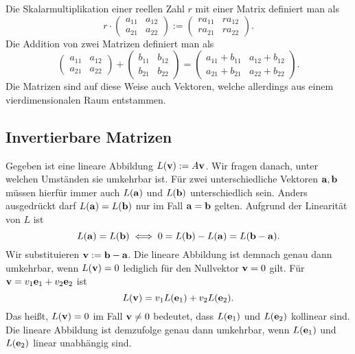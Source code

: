Die Skalarmultiplikation einer reellen Zahl $r$ mit einer Matrix
definiert man als%
\[r\cdot\begin{pmatrix}
a_{11} & a_{12}\\
a_{21} & a_{22}\end{pmatrix}
:= \begin{pmatrix}
ra_{11} & ra_{12}\\
ra_{21} & ra_{22}\end{pmatrix}.\]
Die Addition von zwei Matrizen definiert man als%
\[\begin{pmatrix}
a_{11} & a_{12}\\
a_{21} & a_{22}
\end{pmatrix} + \begin{pmatrix}
b_{11} & b_{12}\\
b_{21} & b_{22}
\end{pmatrix} = \begin{pmatrix}
a_{11}+b_{11} & a_{12}+b_{12}\\
a_{21}+b_{21} & a_{22}+b_{22}
\end{pmatrix}.\]
Die Matrizen sind auf diese Weise auch Vektoren, welche allerdings
aus einem vierdimensionalen Raum entstammen.

\subsection{Invertierbare Matrizen}

Gegeben ist eine lineare Abbildung $L(\mathbf{v}):=A\mathbf{v}$. Wir
fragen danach, unter welchen Umständen sie umkehrbar ist. Für zwei
unterschiedliche Vektoren $\mathbf{a},\mathbf{b}$ müssen hierfür immer auch
$L(\mathbf{a})$ und $L(\mathbf{b})$ unterschiedlich sein. Anders ausgedrückt darf
$L(\mathbf{a})=L(\mathbf{b})$ nur im Fall $\mathbf{a}=\mathbf{b}$ gelten. Aufgrund
der Linearität von $L$ ist%
\[L(\mathbf{a})=L(\mathbf{b})\iff 0 = L(\mathbf{b})-L(\mathbf{a})
= L(\mathbf{b}-\mathbf{a}).\]
Wir substituieren $\mathbf{v}:=\mathbf{b}-\mathbf{a}$. Die lineare Abbildung
ist demnach genau dann umkehrbar, wenn $L(\mathbf{v})=0$ lediglich
für den Nullvektor $\mathbf{v}=0$ gilt. Für
$\mathbf{v} = v_1\mathbf{e}_1+v_2\mathbf{e}_2$ ist%
\[L(\mathbf{v}) = v_1L(\mathbf{e}_1)+v_2L(\mathbf{e}_2).\]
Das heißt, $L(\mathbf{v})=0$ im Fall $\mathbf{v}\ne 0$ bedeutet, dass
$L(\mathbf{e}_1)$ und $L(\mathbf{e}_2)$ kollinear sind. Die lineare
Abbildung ist demzufolge genau dann umkehrbar, wenn
$L(\mathbf{e}_1)$ und $L(\mathbf{e}_2)$ linear unabhängig sind.

